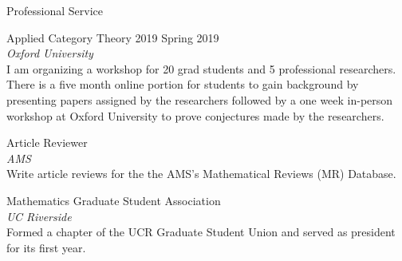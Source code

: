 \documentclass{Resume} %
\begin{document}
\begin{rSection}{Professional Service}

  {\sc Applied Category Theory 2019}
  \hfill
  Spring 2019 \\
  {\em Oxford University} \\
  I am organizing a workshop for 20 grad students and 5 professional
  researchers. There is a five month online portion for students to
  gain background by presenting papers assigned by the researchers
  followed by a one week in-person workshop at Oxford University to
  prove conjectures made by the researchers.

  {\sc Article Reviewer} \\
  {\em AMS} \\
  Write article reviews for the the AMS's Mathematical Reviews
  (MR) Database.  

  {\sc Mathematics Graduate Student Association} \\
  {\em UC Riverside} \\
  Formed a chapter of the UCR Graduate Student Union and served as
  president for its first year.
  
\end{rSection}


\end{document}

